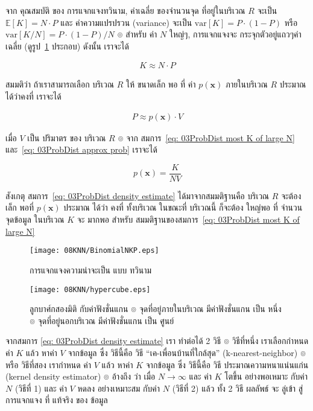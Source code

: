 จาก คุณสมบัติ ของ การแจกแจงทวินาม, ค่าเฉลี่ย ของจำนวนจุด ที่อยู่ในบริเวณ $R$ จะเป็น $\mathbb{E}[K] = N \cdot P$
และ ค่าความแปรปรวน (variance) จะเป็น $\mathrm{var}[K] = P \cdot (1 - P)$ 
หรือ $\mathrm{var}[K/N] = P \cdot (1 - P)/N$ 
๏ สำหรับ ค่า $N$ ใหญ่ๆ, การแจกแจงจะ กระจุกตัวอยู่แถวๆค่าเฉลี่ย (ดูรูป~\ref{fig: Binomial Prob} ประกอบ) ดังนั้น เราจะได้

\begin{eqnarray}
K \approx N \cdot P
\label{eq: 03ProbDist most K of large N}
\end{eqnarray}

สมมติว่า ถ้าเราสามารถเลือก บริเวณ $R$ ให้ ขนาดเล็ก พอ ที่ ค่า $p(\mathbf{x})$ ภายในบริเวณ $R$ ประมาณได้ว่าคงที่ เราจะได้

\begin{eqnarray}
P \approx p(\mathbf{x}) \cdot V
\label{eq: 03ProbDist approx prob}
\end{eqnarray}

เมื่อ $V$ เป็น ปริมาตร ของ บริเวณ $R$
๏ จาก สมการ~\ref{eq: 03ProbDist most K of large N} และ~\ref{eq: 03ProbDist approx prob} เราจะได้

\begin{equation}
  p(\mathbf{x}) = \frac{K}{N V}
\label{eq: 03ProbDist density estimate}
\end{equation}

สังเกตุ สมการ~\ref{eq: 03ProbDist density estimate} ได้มาจากสมมติฐานคือ บริเวณ $R$ จะต้องเล็ก พอที่ $p(\mathbf{x})$ ประมาณ ได้ว่า คงที่ ทั้งบริเวณ ในขณะที่ บริเวณนี้ ก็จะต้อง ใหญ่พอ ที่ จำนวน จุดข้อมูล ในบริเวณ $K$ จะ มากพอ สำหรับ สมมติฐานของสมการ~\ref{eq: 03ProbDist most K of large N}

%
\begin{figure}
\begin{center}
\texttt{[image: 08KNN/BinomialNKP.eps]}
\end{center}
\caption{การแจกแจงความน่าจะเป็น แบบ ทวินาม}
\label{fig: Binomial Prob}
\end{figure}

%
\begin{figure}
\begin{center}
\texttt{[image: 08KNN/hypercube.eps]}
\end{center}
\caption{ลูกบาศ์กสองมิติ กับค่าฟังชั่นแกน 
๏ จุดที่อยู่ภายในบริเวณ มีค่าฟังชั่นแกน เป็น หนึ่ง 
๏ จุดที่อยู่นอกบริเวณ มีค่าฟังชั่นแกน เป็น ศูนย์}
\label{fig: hypercube}
\end{figure}

จากสมการ \ref{eq: 03ProbDist density estimate} เรา ทำต่อได้ 2 วิธี
๏ วิธีที่หนึ่ง เราเลือกกำหนด ค่า $K$ แล้ว หาค่า $V$ จากข้อมูล ซึ่ง วิธีนี้คือ วิธี ``เค-เพื่อนบ้านที่ใกล้สุด'' (k-nearest-neighbor)
๏ หรือ วิธีที่สอง เรากำหนด ค่า $V$ แล้ว หาค่า $K$ จากข้อมูล ซึ่ง วิธีนี้คือ วิธี ประมาณความหนาแน่นแก่น (kernel density estimator)
๏ \cite{Bishop2007} อ้างถึง  \cite{DudaHart1973} ว่า เมื่อ $N \to \infty$ และ ค่า $K$ โตขึ้น อย่างพอเหมาะ กับค่า $N$ (วิธีที่ 1) และ ค่า $V$ หดลง อย่างเหมาะสม กับค่า $N$ (วิธีที่ 2) แล้ว ทั้ง 2 วิธี ผลลัพธ์ จะ ลู่เข้า สู่ การแจกแจง ที่ แท้จริง ของ ข้อมูล

